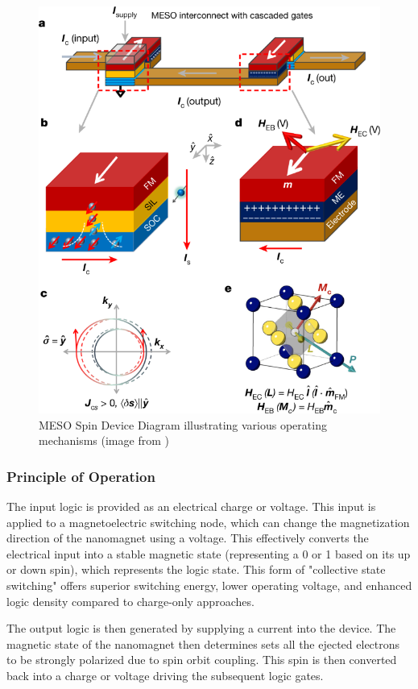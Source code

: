 \documentclass[sigconf]{acmart}
\begin{document}
\begin{figure}[h]
  \centering
  \includegraphics[width = \linewidth]{images/41586_2018_770_Fig2_HTML.png}
  \caption{MESO Spin Device Diagram illustrating various operating mechanisms (image from 
  \cite{manipatruni2019scalable})}
\end{figure}

\subsubsection{Principle of Operation}
The input logic is provided as an electrical charge or voltage. 
This input is applied to a magnetoelectric switching node, which 
can change the magnetization direction of the nanomagnet using a 
voltage. This effectively converts the electrical input into a 
stable magnetic state (representing a 0 or 1 based on its up or 
down spin), which represents the logic state. This form of 
"collective state switching" offers superior switching energy, 
lower operating voltage, and enhanced logic density compared to 
charge-only approaches.

The output logic is then generated by supplying a current into 
the device. The magnetic state of the nanomagnet then determines 
sets all the ejected electrons to be strongly polarized due to spin
orbit coupling. This spin is then converted back into a charge 
or voltage driving the subsequent logic gates. 
\end{document}
